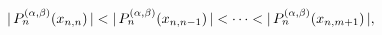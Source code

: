 $|\mathop{P^{(\alpha,\beta)}_{n}\/}\nolimits\!\left(x_{n,n}\right)|<|\mathop{P^%
{(\alpha,\beta)}_{n}\/}\nolimits\!\left(x_{n,n-1}\right)|<\cdots<|\mathop{P^{(%
\alpha,\beta)}_{n}\/}\nolimits\!\left(x_{n,m+1}\right)|,$